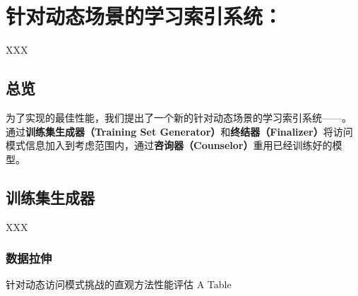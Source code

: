 \chapter{针对动态场景的学习索引系统：\sys}
\label{chap:sys}

XXX

\section{总览}

为了实现{\li}的最佳性能，我们提出了一个新的针对动态场景的学习索引系统{------}{\sys}。
{\sys}通过\textbf{训练集生成器（Training Set Generator）}和\textbf{终结器（Finalizer）}将访问模式信息加入到考虑范围内，通过\textbf{咨询器（Counselor）}重用已经训练好的模型。


\section{训练集生成器}

XXX

\subsection{数据拉伸}

\begin{table}[!hpb]
  \centering
  \bicaption[指向一个表格的表目录索引]
    {针对动态访问模式挑战的直观方法性能评估}
    {A Table}
  \label{tab:pattern-int-sol}
  \begin{tabular}{@{}llr@{}} \toprule
  \end{tabular}
\end{table}

